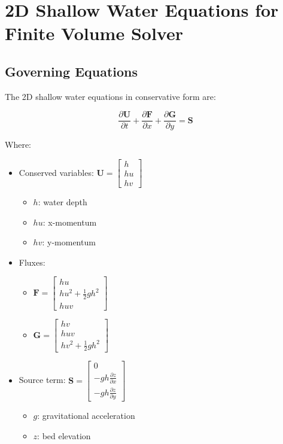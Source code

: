 \documentclass[a4paper,12pt]{article}
\begin{document}
\section*{2D Shallow Water Equations for Finite Volume Solver}

\subsection*{Governing Equations}
The 2D shallow water equations in conservative form are:

\[
\frac{\partial \mathbf{U}}{\partial t} + \frac{\partial \mathbf{F}}{\partial x} + \frac{\partial \mathbf{G}}{\partial y} = \mathbf{S}
\]

Where:
\begin{itemize}
    \item Conserved variables: \(\mathbf{U} = \begin{bmatrix} h \\ hu \\ hv \end{bmatrix}\)
    \begin{itemize}
        \item \(h\): water depth
        \item \(hu\): x-momentum
        \item \(hv\): y-momentum
    \end{itemize}
    \item Fluxes:
    \begin{itemize}
        \item \(\mathbf{F} = \begin{bmatrix} hu \\ hu^2 + \frac{1}{2}gh^2 \\ huv \end{bmatrix}\)
        \item \(\mathbf{G} = \begin{bmatrix} hv \\ huv \\ hv^2 + \frac{1}{2}gh^2 \end{bmatrix}\)
    \end{itemize}
    \item Source term: \(\mathbf{S} = \begin{bmatrix} 0 \\ -gh \frac{\partial z}{\partial x} \\ -gh \frac{\partial z}{\partial y} \end{bmatrix}\)
    \begin{itemize}
        \item \(g\): gravitational acceleration
        \item \(z\): bed elevation
    \end{itemize}
\end{itemize}
\end{document}

